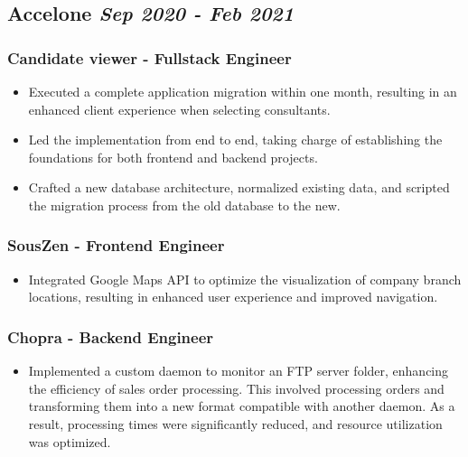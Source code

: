 \documentclass[10pt, a4paper]{article}
\begin{document}
\subsection*{Accelone \hfill \small \textit{Sep 2020 - Feb 2021}}

\subsubsection*{Candidate viewer - Fullstack Engineer}
\begin{itemize}
    \setlength\itemsep{0em}
    \item Executed a complete application migration within one month, resulting in an enhanced client experience when selecting consultants.
    \item Led the implementation from end to end, taking charge of establishing the foundations for both frontend and backend projects.
    \item Crafted a new database architecture, normalized existing data, and scripted the migration process from the old database to the new.
\end{itemize}

\subsubsection*{SousZen - Frontend Engineer}
\begin{itemize}
    \setlength\itemsep{0em}
    \item Integrated Google Maps API to optimize the visualization of company branch locations, resulting in enhanced user experience and improved navigation.
\end{itemize}

\subsubsection*{Chopra - Backend Engineer}
\begin{itemize}
    \setlength\itemsep{0em}
    \item Implemented a custom daemon to monitor an FTP server folder, enhancing the efficiency of sales order processing. This involved processing orders and transforming them into a new format compatible with another daemon. As a result, processing times were significantly reduced, and resource utilization was optimized.
\end{itemize}
\end{document}
